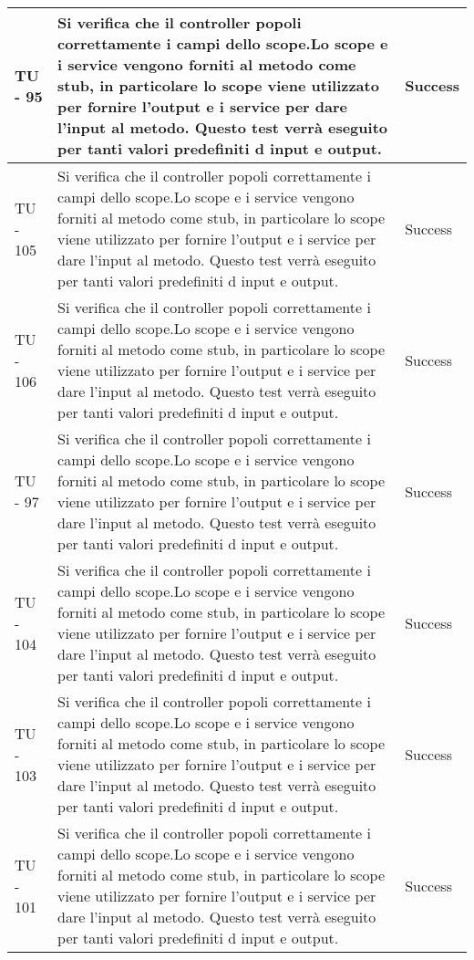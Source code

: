 \begin{center}
\begin{longtable}{ | p{3cm} | p{9cm} | p{2cm} | }
TU - 95 & Si verifica che il controller popoli correttamente i campi dello scope.Lo scope e i service vengono forniti al metodo come stub, in particolare lo scope viene utilizzato per fornire l'output e i service per dare l'input al metodo. Questo test verrà eseguito per tanti valori predefiniti d input e output. & Success \\ \hline
TU - 105 & Si verifica che il controller popoli correttamente i campi dello scope.Lo scope e i service vengono forniti al metodo come stub, in particolare lo scope viene utilizzato per fornire l'output e i service per dare l'input al metodo. Questo test verrà eseguito per tanti valori predefiniti d input e output.
 & Success \\ \hline
TU - 106 & Si verifica che il controller popoli correttamente i campi dello scope.Lo scope e i service vengono forniti al metodo come stub, in particolare lo scope viene utilizzato per fornire l'output e i service per dare l'input al metodo. Questo test verrà eseguito per tanti valori predefiniti d input e output. & Success \\ \hline
TU - 97 & Si verifica che il controller popoli correttamente i campi dello scope.Lo scope e i service vengono forniti al metodo come stub, in particolare lo scope viene utilizzato per fornire l'output e i service per dare l'input al metodo. Questo test verrà eseguito per tanti valori predefiniti d input e output. & Success \\ \hline
TU - 104 & Si verifica che il controller popoli correttamente i campi dello scope.Lo scope e i service vengono forniti al metodo come stub, in particolare lo scope viene utilizzato per fornire l'output e i service per dare l'input al metodo. Questo test verrà eseguito per tanti valori predefiniti d input e output.
 & Success \\ \hline
TU - 103 & Si verifica che il controller popoli correttamente i campi dello scope.Lo scope e i service vengono forniti al metodo come stub, in particolare lo scope viene utilizzato per fornire l'output e i service per dare l'input al metodo. Questo test verrà eseguito per tanti valori predefiniti d input e output.
 & Success \\ \hline
TU - 101 & Si verifica che il controller popoli correttamente i campi dello scope.Lo scope e i service vengono forniti al metodo come stub, in particolare lo scope viene utilizzato per fornire l'output e i service per dare l'input al metodo. Questo test verrà eseguito per tanti valori predefiniti d input e output. & Success \\ \hline

\end{longtable}
\end{center}
